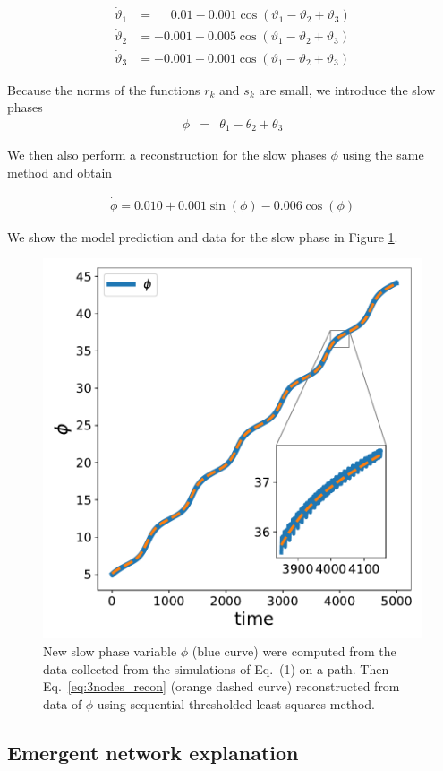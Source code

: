 \documentclass[12pt]{article}
\theoremstyle{plain}
\theoremstyle{definition}
\theoremstyle{remark}
\theoremstyle{remark}
\begin{document}
\begin{align}
\dot{\vartheta}_1 &= \,\,\,\,\,\,\,\,0.01 - 0.001\cos(\vartheta_1 - \vartheta_2 + \vartheta_3) \\
\dot{\vartheta}_2 &= -0.001  + 0.005 \cos(\vartheta_1 - \vartheta_2 + \vartheta_3) \\
\dot{\vartheta}_3 &= -0.001 - 0.001 \cos(\vartheta_1 - \vartheta_2 + \vartheta_3) 
\end{align}

Because the norms of the functions $r_k$ and $s_k$ are small, we introduce the slow phases 
\begin{eqnarray}\label{new_phi}
\phi &=& \theta_1  - \theta_2 + \theta_3 \nonumber
\end{eqnarray} 


We then also perform a reconstruction for the slow phases $\phi$ using the same method  and obtain 

\begin{align}\label{eq:3nodes_recon}
\dot{\phi} = 0.010+ 0.001\sin(\phi) - 0.006\cos(\phi) 
\end{align}

We show the  model prediction and data for the slow phase in Figure \ref{fig:3nodes_phi}.
\begin{figure}[h]
    \centering
    \includegraphics[width=0.5\columnwidth]{3nodes_triplet_phi.pdf}
    \caption{ New slow phase variable  $\phi$ (blue curve) were computed from the data  collected from the simulations of Eq.~(1) on a path. Then Eq.~\ref{eq:3nodes_recon} (orange dashed curve) reconstructed from data of $\phi$ using sequential thresholded least squares method.}
    \label{fig:3nodes_phi}
\end{figure}

\subsection{Emergent network explanation}
\end{document}
